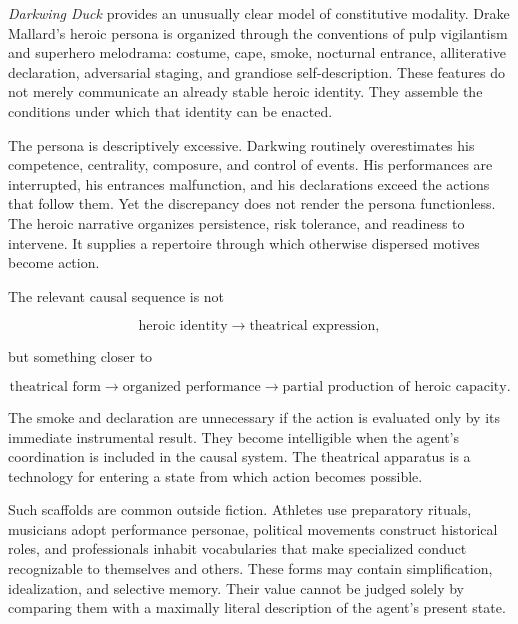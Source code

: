 \documentclass[11pt]{article}
\begin{document}
\emph{Darkwing Duck} provides an unusually clear model of constitutive
modality. Drake Mallard's heroic persona is organized through the conventions
of pulp vigilantism and superhero melodrama: costume, cape, smoke, nocturnal
entrance, alliterative declaration, adversarial staging, and grandiose
self-description. These features do not merely communicate an already stable
heroic identity. They assemble the conditions under which that identity can
be enacted.

The persona is descriptively excessive. Darkwing routinely overestimates his
competence, centrality, composure, and control of events. His performances are
interrupted, his entrances malfunction, and his declarations exceed the
actions that follow them. Yet the discrepancy does not render the persona
functionless. The heroic narrative organizes persistence, risk tolerance, and
readiness to intervene. It supplies a repertoire through which otherwise
dispersed motives become action.

The relevant causal sequence is not

\begin{equation}
  \text{heroic identity}
  \longrightarrow
  \text{theatrical expression},
  \label{eq:identity-expression}
\end{equation}

but something closer to

\begin{equation}
  \text{theatrical form}
  \longrightarrow
  \text{organized performance}
  \longrightarrow
  \text{partial production of heroic capacity}.
  \label{eq:form-capacity}
\end{equation}

The smoke and declaration are unnecessary if the action is evaluated only by
its immediate instrumental result. They become intelligible when the agent's
coordination is included in the causal system. The theatrical apparatus is a
technology for entering a state from which action becomes possible.

Such scaffolds are common outside fiction. Athletes use preparatory rituals,
musicians adopt performance personae, political movements construct historical
roles, and professionals inhabit vocabularies that make specialized conduct
recognizable to themselves and others. These forms may contain simplification,
idealization, and selective memory. Their value cannot be judged solely by
comparing them with a maximally literal description of the agent's present
state.
\end{document}
